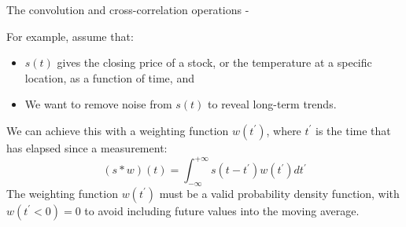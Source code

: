 \begin{frame}[t,allowframebreaks]{The convolution and cross-correlation operations -}
    \begin{blockexample}{}
        \small
        For example, assume that:
        \begin{itemize}
            \small
            \item 
              $s(t)$ gives the closing price of a stock, 
              or the temperature at a specific location, as a function of time, and
            \item
              We want to remove noise from $s(t)$ to reveal long-term trends.          
        \end{itemize}
        We can achieve this with a weighting function $w(t^\prime)$,
        where $t^\prime$ is the time that has elapsed since a measurement:
        \begin{equation}
            (s \ast w) (t) = 
              \int_{-\infty}^{+\infty} 
                s(t-t^\prime) w(t^\prime) dt^\prime
            \label{eq:convolution_cont1d_low_pass_filter_1}
        \end{equation}
        The weighting function $w(t^\prime)$ must be a valid probability density function,
        with $w(t^\prime<0)=0$ to avoid including future values into the moving average.
    \end{blockexample}

    \framebreak


\end{frame}

